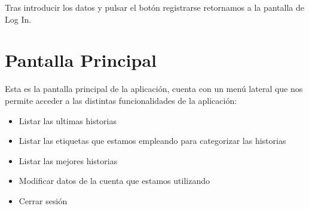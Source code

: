 \documentclass[11pt,a4paper, titlepage]{article}
\begin{document}
Tras introducir los datos y pulsar el botón registrarse retornamos a la pantalla de Log In.
	
	\section[Pantalla Principal]{Pantalla Principal}
	\label{inPrin}
	
	Esta es la pantalla principal de la aplicación, cuenta con un menú lateral que nos permite acceder a las distintas funcionalidades de la aplicación:
	
	\begin{itemize}
		\item Listar las ultimas historias
		\item Listar las etiquetas que estamos empleando para categorizar las historias
		\item Listar las mejores historias
		\item Modificar datos de la cuenta que estamos utilizando
		\item Cerrar sesión
	\end{itemize}
	
\end{document}
